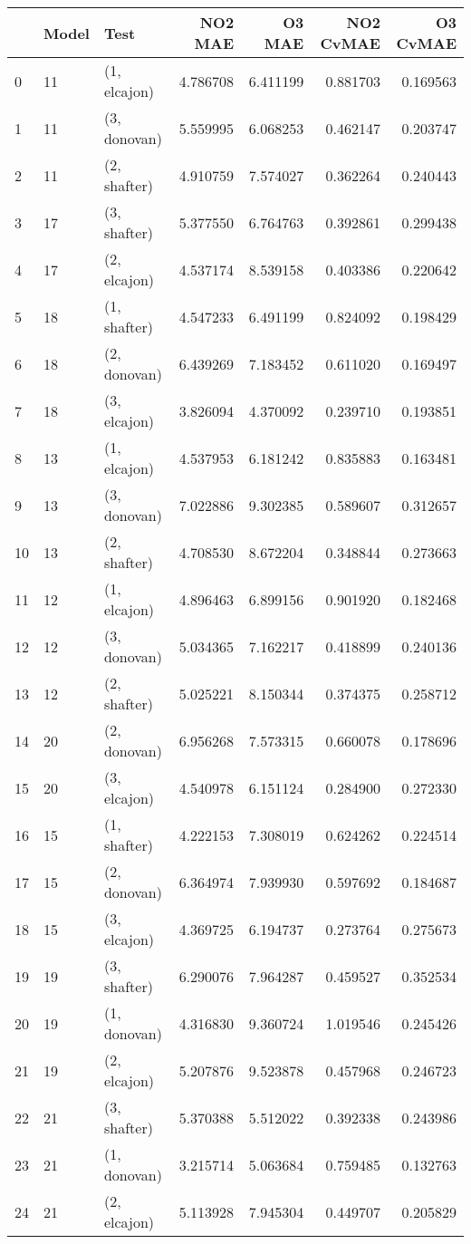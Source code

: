 \begin{tabular}{lllrrrr}
\toprule
{} & Model &          Test &   NO2 MAE &    O3 MAE &  NO2 CvMAE &  O3 CvMAE \\
\midrule
0  &    11 &  (1, elcajon) &  4.786708 &  6.411199 &   0.881703 &  0.169563 \\
1  &    11 &  (3, donovan) &  5.559995 &  6.068253 &   0.462147 &  0.203747 \\
2  &    11 &  (2, shafter) &  4.910759 &  7.574027 &   0.362264 &  0.240443 \\
3  &    17 &  (3, shafter) &  5.377550 &  6.764763 &   0.392861 &  0.299438 \\
4  &    17 &  (2, elcajon) &  4.537174 &  8.539158 &   0.403386 &  0.220642 \\
5  &    18 &  (1, shafter) &  4.547233 &  6.491199 &   0.824092 &  0.198429 \\
6  &    18 &  (2, donovan) &  6.439269 &  7.183452 &   0.611020 &  0.169497 \\
7  &    18 &  (3, elcajon) &  3.826094 &  4.370092 &   0.239710 &  0.193851 \\
8  &    13 &  (1, elcajon) &  4.537953 &  6.181242 &   0.835883 &  0.163481 \\
9  &    13 &  (3, donovan) &  7.022886 &  9.302385 &   0.589607 &  0.312657 \\
10 &    13 &  (2, shafter) &  4.708530 &  8.672204 &   0.348844 &  0.273663 \\
11 &    12 &  (1, elcajon) &  4.896463 &  6.899156 &   0.901920 &  0.182468 \\
12 &    12 &  (3, donovan) &  5.034365 &  7.162217 &   0.418899 &  0.240136 \\
13 &    12 &  (2, shafter) &  5.025221 &  8.150344 &   0.374375 &  0.258712 \\
14 &    20 &  (2, donovan) &  6.956268 &  7.573315 &   0.660078 &  0.178696 \\
15 &    20 &  (3, elcajon) &  4.540978 &  6.151124 &   0.284900 &  0.272330 \\
16 &    15 &  (1, shafter) &  4.222153 &  7.308019 &   0.624262 &  0.224514 \\
17 &    15 &  (2, donovan) &  6.364974 &  7.939930 &   0.597692 &  0.184687 \\
18 &    15 &  (3, elcajon) &  4.369725 &  6.194737 &   0.273764 &  0.275673 \\
19 &    19 &  (3, shafter) &  6.290076 &  7.964287 &   0.459527 &  0.352534 \\
20 &    19 &  (1, donovan) &  4.316830 &  9.360724 &   1.019546 &  0.245426 \\
21 &    19 &  (2, elcajon) &  5.207876 &  9.523878 &   0.457968 &  0.246723 \\
22 &    21 &  (3, shafter) &  5.370388 &  5.512022 &   0.392338 &  0.243986 \\
23 &    21 &  (1, donovan) &  3.215714 &  5.063684 &   0.759485 &  0.132763 \\
24 &    21 &  (2, elcajon) &  5.113928 &  7.945304 &   0.449707 &  0.205829 \\
\bottomrule
\end{tabular}
